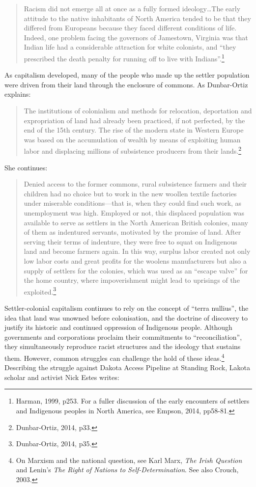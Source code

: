 \blockquote{Racism did not emerge all at once as a fully formed ideology\ldots The early attitude to the native inhabitants of North America tended to be that they differed from Europeans because they faced different conditions of life. Indeed, one problem facing the governors of Jamestown, Virginia was that Indian life had a considerable attraction for white colonists, and ``they prescribed the death penalty for running off to live with Indians''.\footnote{Harman, 1999, p253. For a fuller discussion of the early encounters of settlers and Indigenous peoples in North America, see Empson, 2014, pp58-81.}}

As capitalism developed, many of the people who made up the settler population were driven from their land through the enclosure of commons. As Dunbar-Ortiz explains:

\blockquote{The institutions of colonialism and methods for relocation, deportation and expropriation of land had already been practiced, if not perfected, by the end of the 15th century. The rise of the modern state in Western Europe was based on the accumulation of wealth by means of exploiting human labor and displacing millions of subsistence producers from their lands.\footnote{Dunbar-Ortiz, 2014, p33.}}

She continues:

\blockquote{Denied access to the former commons, rural subsistence farmers and their children had no choice but to work in the new woollen textile factories under miserable conditions---that is, when they could find such work, as unemployment was high. Employed or not, this displaced population was available to serve as settlers in the North American British colonies, many of them as indentured servants, motivated by the promise of land. After serving their terms of indenture, they were free to squat on Indigenous land and become farmers again. In this way, surplus labor created not only low labor costs and great profits for the woolens manufacturers but also a supply of settlers for the colonies, which was used as an ``escape valve'' for the home country, where impoverishment might lead to uprisings of the exploited.\footnote{Dunbar-Ortiz, 2014, p35.}}

Settler-colonial capitalism continues to rely on the concept of ``terra nullius'', the idea that land was unowned before colonisation, and the doctrine of discovery to justify its historic and continued oppression of Indigenous people. Although governments and corporations proclaim their commitments to ``reconciliation'', they simultaneously reproduce racist structures and the ideology that sustains them. However, common struggles can challenge the hold of these ideas.\footnote{On Marxism and the national question, see Karl Marx, \emph{The Irish Question} and Lenin's \emph{The Right of Nations to Self-Determination}. See also Crouch, 2003.} Describing the struggle against Dakota Access Pipeline at Standing Rock, Lakota scholar and activist Nick Estes writes:

